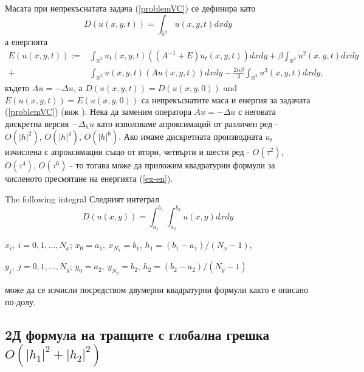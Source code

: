 \documentclass{article}
\newcommand{\rf}[1]{(\ref{#1})}
\newcommand{\RR}{\mathbb{R}}
\begin{document}
Масата при непрекъснатата задача \rf{problemVC} се дефинира като
\begin{equation}\label{intM}
D(u(x,y,t))=\int_{\RR^2} u(x,y,t)dx dy
\end{equation}
а енергията 
\begin{align}\label{ex-en}
E(u(x,y,t)):=&\int_{\RR^2} u_t(x,y,t) \left((A^{-1}+E)u_t(x,y,t)\right) dxdy+
\beta \int_{\RR^2} u^2(x,y,t) dxdy \nonumber\\
+& \int_{\RR^2}u(x,y,t) \left(A u(x,y,t)\right) dxdy
-\frac{2 \alpha \beta}{3} \int_{\RR^2} u^3(x,y,t) dxdy,
\end{align}
където $Au=-\Delta u$, а $D(u(x,y,t)) = D(u(x,y,0))$ and $E(u(x,y,t)) = E(u(x,y,0))$ са непрекъснатите маса и енергия за задачата \rf{problemVC} (виж \cite{ref1}). Нека да заменим оператора $Au=-\Delta u$ с неговата дискретна версия $-\Delta_h u$ като използваме апроксимаций от различен ред - $O(|h|^2)$, $O(|h|^4)$, $O(|h|^6)$. Ако имаме дискретната производната $u_t$ изчислена с апроксимации също от втори, четвърти и шести ред - $O(\tau^2)$, $O(\tau^4)$, $O(\tau^6)$ - то тогава може да приложим квадратурни формули за численото пресмятане на енергията \rf{ex-en}.




The following integral 
Следният интеграл
\begin{equation}\label{int}
D(u(x,y))=\int_{a_1}^{b_1} \int_{a_2}^{b_2} u(x,y)dx dy
\end{equation}

$x_i, ~i=0,1,...,N_x$; $x_0=a_1,~x_{N_x}=b_1$, $h_1=(b_1-a_1)/(N_x-1)$, 


$y_j, ~j=0,1,...,N_y$; $y_0=a_2,~y_{N_y}=b_2$,  $h_2=(b_2-a_2)/(N_y-1)$

може да се изчисли посредством двумерни квадратурни формули както е описано по-долу.

\subsection{ 2Д формула на трапците с глобална грешка $O(|h_1|^2+|h_2|^2)$ }
\end{document}
